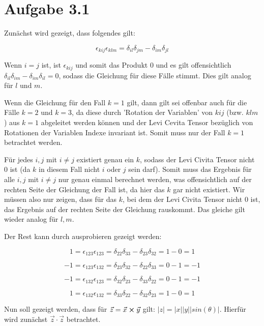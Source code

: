 \documentclass{theozettel}
\begin{document}

\section*{Aufgabe 3.1} 

Zunächst wird gezeigt, dass folgendes gilt:

$$
\epsilon_{kij} \epsilon_{klm} = \delta_{il} \delta_{jm} - \delta_{im} \delta_{jl}
$$

Wenn $i = j$ ist, ist $\epsilon_{kij}$ und somit das Produkt $0$ und es gilt offensichtlich $\delta_{il} \delta_{im} - \delta_{im} \delta_{il} = 0$, sodass die Gleichung für diese Fälle stimmt.
Dies gilt analog für $l$ und $m$.

Wenn die Gleichung für den Fall $k=1$ gilt, dann gilt sei offenbar auch für die Fälle $k=2$ und $k=3$, da diese durch 'Rotation der Variablen' von $kij$ (bzw. $klm$) aus $k=1$ abgeleitet werden können und der Levi Cevita Tensor bezüglich von Rotationen der Variablen Indexe invariant ist. Somit muss nur der Fall $k=1$ betrachtet werden.

Für jedes $i,j$ mit $i \neq j$ existiert genau ein $k$, sodass der Levi Civita Tensor nicht $0$ ist (da $k$ in diesem Fall nicht $i$ oder $j$ sein darf).
Somit muss das Ergebnis für alle $i,j$ mit $i \neq j$ nur genau einmal berechnet werden, was offensichtlich auf der rechten Seite der Gleichung der Fall ist, da hier das $k$ gar nicht existiert. Wir müssen also nur zeigen, dass für das $k$, bei dem der Levi Civita Tensor nicht $0$ ist, das Ergebnis auf der rechten Seite der Gleichung rauskommt. %
Das gleiche gilt wieder analog für $l,m$.

Der Rest kann durch ausprobieren gezeigt werden:

$$
1 = \epsilon_{123} \epsilon_{123} = \delta_{22} \delta_{33} - \delta_{23} \delta_{32} = 1 - 0 = 1
$$

$$
-1 = \epsilon_{123} \epsilon_{132} = \delta_{23} \delta_{32} - \delta_{22} \delta_{33} = 0 - 1 = -1
$$

$$
-1 = \epsilon_{132} \epsilon_{123} = \delta_{32} \delta_{23} - \delta_{33} \delta_{22} = 0 - 1 = -1
$$

$$
1 = \epsilon_{132} \epsilon_{132} = \delta_{33} \delta_{22} - \delta_{32} \delta_{23} = 1 - 0 = 1
$$

Nun soll gezeigt werden, dass für $\vec{z} = \vec{x} \cross \vec{y}$ gilt: $|z| = |x||y||sin(\theta)|$. Hierfür wird zunächst $\vec{z} \cdot \vec{z}$ betrachtet.
\end{document}

